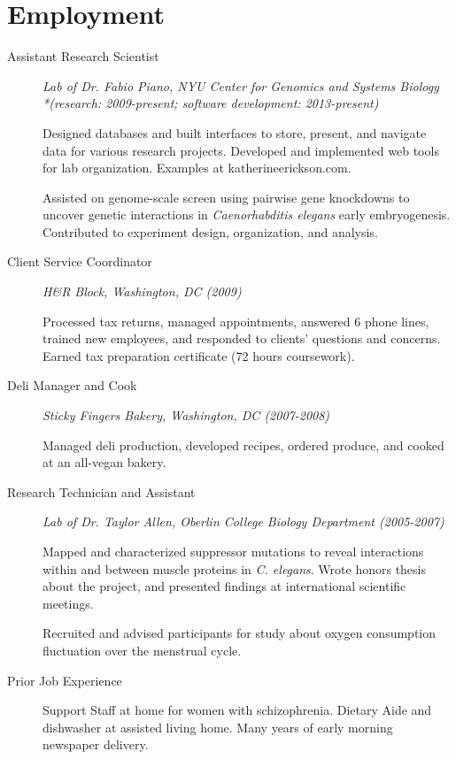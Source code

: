 \documentclass{article}
\begin{document}
	\section*{Employment}
	\begin{description}
		\item[Assistant Research Scientist]
		\emph{Lab of Dr. Fabio Piano,
			NYU Center for Genomics and Systems Biology
			\\*(research: 2009-present; software development: 2013-present)
		}

		Designed databases and built interfaces to store, present, 
		and navigate data for various research projects.
		Developed and implemented web tools for lab organization.
		Examples at katherineerickson.com.
		
		Assisted on genome-scale screen using pairwise gene knockdowns to uncover
		genetic interactions in \emph{Caenorhabditis elegans} early embryogenesis. 
		Contributed to experiment design, organization, and analysis.

		\item[Client Service Coordinator]
		\emph{H\&R Block, Washington, DC (2009)}
			
		Processed tax returns, managed appointments, answered 6 phone lines, 
		trained new employees, and responded to clients' questions and concerns.
		Earned tax preparation certificate (72 hours coursework).

		\item[Deli Manager and Cook]
		\emph{Sticky Fingers Bakery, Washington, DC (2007-2008)}
		
		Managed deli production, developed recipes, ordered produce,
		and cooked at an all-vegan bakery.

		\item[Research Technician and Assistant]
		\emph{Lab of Dr. Taylor Allen,
			Oberlin College Biology Department (2005-2007)
		}
		
		Mapped and characterized suppressor mutations to reveal interactions 
		within and between muscle proteins in \emph{C. elegans}.
		Wrote honors thesis about the project, 
		and presented findings at international scientific meetings.

		Recruited and advised participants for study about oxygen
		consumption fluctuation over the menstrual cycle.

		\item[Prior Job Experience]
		Support Staff at home for women with schizophrenia.
		Dietary Aide and dishwasher at assisted living home.
		Many years of early morning newspaper delivery.
	\end{description}
\end{document}

